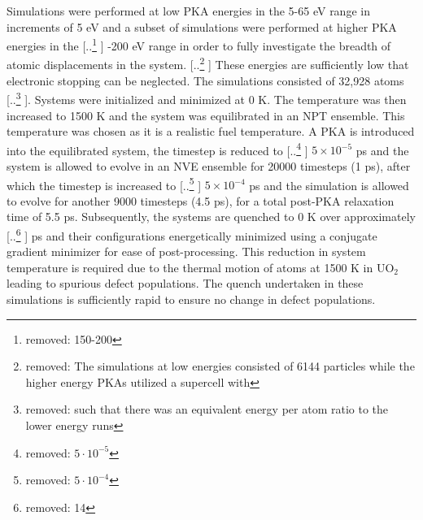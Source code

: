\documentclass[review]{elsarticle} %
\providecommand{\DIFaddtex}[1]{{\protect\color{blue} \sf #1}} %
\providecommand{\DIFdeltex}[1]{{\protect\color{red} [..\footnote{removed: #1} ]}} %
\providecommand{\DIFaddbegin}{} %
\providecommand{\DIFaddend}{} %
\providecommand{\DIFdelbegin}{} %
\providecommand{\DIFdelend}{} %
\providecommand{\DIFadd}[1]{\texorpdfstring{\DIFaddtex{#1}}{#1}} %
\providecommand{\DIFdel}[1]{\texorpdfstring{\DIFdeltex{#1}}{}} %
\newcommand{\DIFscaledelfig}{0.5}
\newlength{\DIFdelgraphicswidth} %
\newlength{\DIFdelgraphicsheight} %
\newcommand{\DIFaddincludegraphics}[2][]{{\color{blue}\fbox{\DIFOincludegraphics[#1]{#2}}}} %
\newcommand{\DIFdelincludegraphics}[2][]{%
\sbox{\DIFdelgraphicsbox}{\DIFOincludegraphics[#1]{#2}}%
\settoboxwidth{\DIFdelgraphicswidth}{\DIFdelgraphicsbox} %
\settoboxtotalheight{\DIFdelgraphicsheight}{\DIFdelgraphicsbox} %
\scalebox{\DIFscaledelfig}{%
\parbox[b]{\DIFdelgraphicswidth}{\usebox{\DIFdelgraphicsbox}\\[-\baselineskip] \rule{\DIFdelgraphicswidth}{0em}}\llap{\resizebox{\DIFdelgraphicswidth}{\DIFdelgraphicsheight}{%
\setlength{\unitlength}{\DIFdelgraphicswidth}%
\begin{picture}(1,1)%
\thicklines\linethickness{2pt} %
{\color[rgb]{1,0,0}\put(0,0){\framebox(1,1){}}}%
{\color[rgb]{1,0,0}\put(0,0){\line( 1,1){1}}}%
{\color[rgb]{1,0,0}\put(0,1){\line(1,-1){1}}}%
\end{picture}%
}\hspace*{3pt}}} %
} %
\DeclareRobustCommand{\DIFaddbegin}{\DIFOaddbegin \let\includegraphics\DIFaddincludegraphics} %
\DeclareRobustCommand{\DIFaddend}{\DIFOaddend \let\includegraphics\DIFOincludegraphics} %
\DeclareRobustCommand{\DIFdelbegin}{\DIFOdelbegin \let\includegraphics\DIFdelincludegraphics} %
\DeclareRobustCommand{\DIFdelend}{\DIFOaddend \let\includegraphics\DIFOincludegraphics} %
\begin{document}
Simulations were performed at low PKA energies in the 5-65 eV range in increments of 5 eV and a subset of simulations were performed at higher PKA energies in the \DIFdelbegin \DIFdel{150-200 }\DIFdelend \DIFaddbegin \DIFadd{100-200 }\DIFaddend eV range in order to fully investigate the breadth of atomic displacements in the system. \DIFdelbegin \DIFdel{The simulations at low energies consisted of 6144 particles while the higher energy PKAs utilized a supercell with }\DIFdelend \DIFaddbegin \DIFadd{These energies are sufficiently low that electronic stopping can be neglected. The simulations consisted of }\DIFaddend 32,928 atoms\DIFdelbegin \DIFdel{such that there was an equivalent energy per atom ratio to the lower energy runs}\DIFdelend . Systems were initialized and minimized at 0 K. The temperature was then increased to 1500 K and the system was equilibrated in an NPT ensemble. This temperature was chosen as it is a realistic fuel temperature. A PKA is introduced into the equilibrated system, the timestep is reduced to \DIFdelbegin \DIFdel{$5\cdot10^{-5}$ }\DIFdelend \DIFaddbegin \DIFadd{$5\times10^{-5}$ }\DIFaddend ps and the system is allowed to evolve in an NVE ensemble for 20000 timesteps (1 ps), after which the timestep is increased to \DIFdelbegin \DIFdel{$5\cdot10^{-4}$ }\DIFdelend \DIFaddbegin \DIFadd{$5\times10^{-4}$ }\DIFaddend ps and the simulation is allowed to evolve for another 9000 timesteps (4.5 ps), for a total post-PKA relaxation time of 5.5 ps. Subsequently, the systems are quenched to 0 K over approximately \DIFdelbegin \DIFdel{14 }\DIFdelend \DIFaddbegin \DIFadd{10 }\DIFaddend ps and their configurations energetically minimized using a conjugate gradient minimizer for ease of post-processing. \DIFaddbegin \DIFadd{This reduction in system temperature is required due to the thermal motion of atoms at 1500 K in UO$_2$ leading to spurious defect populations. The quench undertaken in these simulations is sufficiently rapid to ensure no change in defect populations.
}\DIFaddend 
\end{document}
